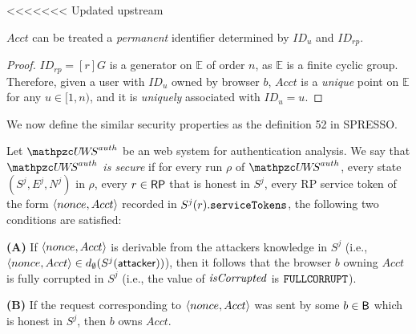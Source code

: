 <<<<<<< Updated upstream
  \begin{lemma}\label{Acct-mapping}
    $Acct$ can be treated a \emph{permanent} identifier 
    determined by $ID_u$ and $ID_{rp}$. 
  \end{lemma}
  \begin{proof}
    $ID_{rp} = [r]G$ is a generator on $\mathbb{E}$ of order $n$, 
    as $\mathbb{E}$ is a finite cyclic group. 
    Therefore, given a user with $ID_u$ owned by browser $b$, $Acct$ is a \emph{unique} point on 
    $\mathbb{E}$ for any $u \in [1, n)$, and it is \emph{uniquely} 
    associated with $ID_u=u$.
  \end{proof}
  
  We now define the similar security properties as the definition 52 in SPRESSO. 
  
  \begin{definition}\label{def:uppresso-security-property} 
    Let $\uppressoauthwebsystem$ be an \uppresso web system for authentication analysis. 
    We say that \emph{$\uppressoauthwebsystem$ is secure} if for every run $\rho$ of
    $\uppressoauthwebsystem$, every state $(S^j, E^j, N^j)$ in $\rho$,
    every $r\in \mathsf{RP}$ that is honest in $S^j$, every RP service token of the form 
    $\langle {{}nonce, Acct} \rangle$ recorded in $S^j(r).\mathtt{serviceTokens}$, the following two conditions are
    satisfied:
  
    \textbf{(A)} If $\langle {{}nonce, Acct} \rangle$ is derivable from the attackers knowledge
    in $S^j$ (i.e., $\langle {{}nonce, Acct} \rangle \in d_{\emptyset}(S^j(\mathsf{attacker}))$),
    then it follows that the browser $b$ owning $Acct$ is fully corrupted
    in $S^j$ (i.e., the value of $\mathit{isCorrupted}$ is $\mathtt{FULLCORRUPT}$).
  
    \textbf{(B)} If the request corresponding to $\langle {{}nonce, Acct} \rangle$ was sent by
    some $b\in \mathsf{B}$ which is honest in $S^j$, then $b$ owns $Acct$.
  \end{definition}
  
  
  
